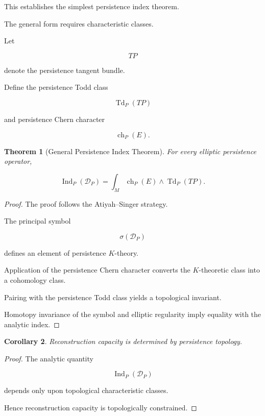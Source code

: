 \documentclass[12pt,oneside]{article}
\newtheorem{theorem}{Theorem}[section] \newtheorem{lemma}[theorem]{Lemma} \newtheorem{proposition}[theorem]{Proposition} \newtheorem{corollary}[theorem]{Corollary}
\theoremstyle{definition}
\begin{document}
This establishes the simplest persistence index theorem.

The general form requires characteristic classes.

Let

\[
TP
\]

denote the persistence tangent bundle.

Define the persistence Todd class

\[
\operatorname{Td}_P(TP)
\]

and persistence Chern character

\[
\operatorname{ch}_P(E).
\]

\begin{theorem}[General Persistence Index Theorem]

For every elliptic persistence operator,

\[
\operatorname{Ind}_P(\mathcal D_P)
=
\int_M
\operatorname{ch}_P(E)
\wedge
\operatorname{Td}_P(TP).
\]

\end{theorem}

\begin{proof}

The proof follows the Atiyah--Singer strategy.

The principal symbol

\[
\sigma(\mathcal D_P)
\]

defines an element of persistence \(K\)-theory.

Application of the persistence Chern character converts the \(K\)-theoretic class into a cohomology class.

Pairing with the persistence Todd class yields a topological invariant.

Homotopy invariance of the symbol and elliptic regularity imply equality with the analytic index.

\end{proof}

\begin{corollary}

Reconstruction capacity is determined by persistence topology.

\end{corollary}

\begin{proof}

The analytic quantity

\[
\operatorname{Ind}_P(\mathcal D_P)
\]

depends only upon topological characteristic classes.

Hence reconstruction capacity is topologically constrained.

\end{proof}
\end{document}
